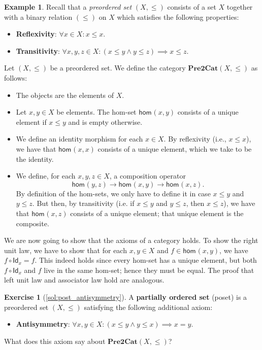 \documentclass[a4paper,11pt, oneside,titlepage=false]{scrbook}
\theoremstyle{plain}
\theoremstyle{definition}
\newtheorem{exa}[thm]{Example}
\newtheorem{exer}[thm]{Exercise}
\newcommand{\cfont}[1]{\ensuremath{\mathsf{#1}}}
\newcommand{\Catb}[1]{\mathbf{#1}}
\newcommand{\PREtoCAT}{\Catb{Pre2Cat}}
\newcommand{\Hom}[3][]{\cfont{hom}_{#1}(#2,#3)}
\newcommand{\Id}[1][]{\cfont{Id}_{#1}}
\newcommand{\co}[2]{\ensuremath{#2 \circ #1}}
\begin{document}
\begin{exa}\label{example:posetcategories}
Recall that a \textit{preordered set} $(X,\leq)$ consists of a set $X$ together with a binary relation $(\leq)$ on $X$ which satisfies the following properties:
\begin{itemize}
\item \textbf{Reflexivity}: $\forall x\in X: x\leq x$.
\item \textbf{Transitivity}: $\forall x,y,z\in X: \left(x\leq y \wedge y\leq z\right) \implies x\leq z$.
\end{itemize}

  Let $(X,\leq)$ be a preordered set. We define the category $\PREtoCAT(X,\leq)$ as follows:
\begin{itemize}
\item The objects are the elements of $X$.
\item Let $x,y \in X$ be elements. The hom-set $\Hom x y$ consists of a unique element if $x\leq y$ and is empty otherwise.
\item  We define an identity morphism for each $x\in X$.
  By reflexivity (i.e., $x\leq x$), we have that $\Hom x x$ consists of a unique element, which we take to be the identity.
\item We define, for each $x,y,z\in X$, a composition operator
\[
\Hom y z \to \Hom x y \to \Hom x z.
\]
By definition of the hom-sets, we only have to define it in case $x\leq y$ and $y\leq z$.
But then, by transitivity (i.e. if $x\leq y$ and $y\leq z$, then $x\leq z$), we have that $\Hom x z$ consists of a unique element; that unique element is the composite.
\end{itemize}
%
We are now going to show that the axioms of a category holds.
To show the right unit law, we have to show that for each $x,y\in X$ and $f\in \Hom x y$, we have $\co{\Id[x]}{f} = f$.
This indeed holds since every hom-set has a unique element, but both $\co{\Id[x]}{f}$ and $f$ live in the same hom-set; hence they must be equal.
The proof that left unit law and associator law hold are analogous.
\end{exa}

\begin{exer}[\cref{sol:post_antisymmetry}]\label{exer:post_antisymmetry}
  A \textbf{partially ordered set} (poset) is a preordered set $(X,\leq)$ satisfying the following additional axiom:
  \begin{itemize}
  \item \textbf{Antisymmetry}: $\forall x,y\in X: (x\leq y \wedge y\leq x) \implies x=y$.
  \end{itemize}
  What does this axiom say about $\PREtoCAT(X,\leq)$?
\end{exer}
\end{document}
